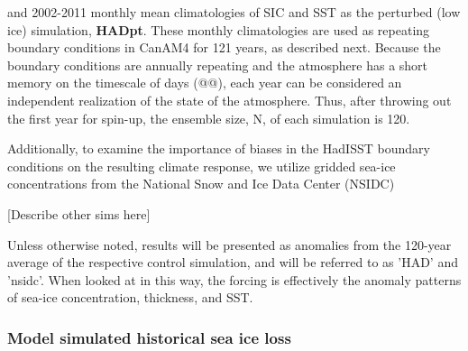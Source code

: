 \documentclass[twocol]{ametsoc}
\begin{document}
 and 2002-2011 monthly mean climatologies of SIC and SST as the perturbed (low ice) simulation, \textbf{HADpt}. These monthly climatologies are used as repeating boundary conditions in CanAM4 for 121 years, as described next. Because the boundary conditions are annually repeating and the atmosphere has a short memory on the timescale of days (@@), each year can be considered an independent realization of the state of the atmosphere. Thus, after throwing out the first year for spin-up, the ensemble size, N, of each simulation is 120.  %


Additionally, to examine the importance of biases in the HadISST boundary conditions on the resulting climate response, we utilize gridded sea-ice concentrations from the National Snow and Ice Data Center (NSIDC)

[Describe other sims here]

Unless otherwise noted, results will be presented as anomalies from the 120-year average of the respective control simulation, and will be referred to as 'HAD' and 'nsidc'. When looked at in this way, the forcing is effectively the anomaly patterns of sea-ice concentration, thickness, and SST. 
 
\subsubsection{Model simulated historical sea ice loss}
\end{document}
